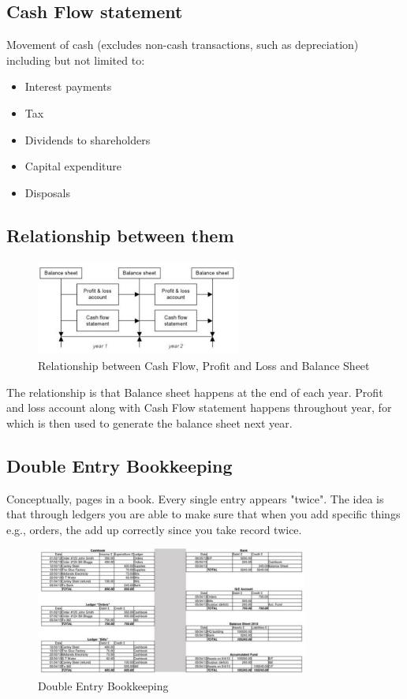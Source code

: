 \documentclass[a4paper]{article}
\theoremstyle{plain}
\theoremstyle{definition}
\theoremstyle{remark}
\begin{document}
\subsection{Cash Flow statement}
Movement of cash (excludes non-cash transactions, such as depreciation) including but not limited to:
\begin{itemize}
	\item Interest payments
	\item Tax
	\item Dividends to shareholders
	\item Capital expenditure
	\item Disposals
\end{itemize}
\subsection{Relationship between them}
\begin{figure}[H]
	\centering
	\includegraphics[width=0.6\textwidth]{images/relation.png}
	\caption{Relationship between Cash Flow, Profit and Loss and Balance Sheet}
	\label{fig:images-relation-png}
\end{figure}
The relationship is that Balance sheet happens at the end of each year. Profit and loss account along with Cash Flow statement happens throughout year, for which is then used to generate the balance sheet next year.
\subsection{Double Entry Bookkeeping}
Conceptually, pages in a book. Every single entry appears "twice". The idea is that through ledgers you are able to make sure that when you add specific things e.g., orders, the add up correctly since you take record twice.
\begin{figure}[H]
	\centering
	\includegraphics[width=0.8\textwidth]{images/doubleentry.png}
	\caption{Double Entry Bookkeeping}
	\label{fig:images-doubleentry-png}
\end{figure}
\end{document}
